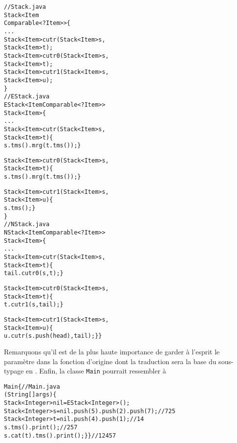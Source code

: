 \begin{alltt}
// Stack.java
\public \abstractX \class Stack<Item
\hfill\extends Comparable<? \super Item>> \{
  ...
  \public    \abstractX Stack<Item> cutr(\final Stack<Item> s,
                                      \final Stack<Item> t);
  \protectedX \abstractX Stack<Item> cutr0(\final Stack<Item> s,
                                       \final Stack<Item> t);
  \protectedX \abstractX Stack<Item> cutr1(\final Stack<Item> s,
                                       \final Stack<Item> u);
\}
// EStack.java
\public \class EStack<Item \extends Comparable<? \super Item>>
       \extends Stack<Item> \{
  ...
  \public Stack<Item> cutr(\final Stack<Item> s,
                          \final Stack<Item> t) \{
    \return s.tms().mrg(t.tms()); \}

  \protectedX Stack<Item> cutr0(\final Stack<Item> s,
                              \final Stack<Item> t) \{
    \return s.tms().mrg(t.tms()); \}

  \protectedX Stack<Item> cutr1(\final Stack<Item> s,
                              \final Stack<Item> u) \{
    \return s.tms(); \}
\}
// NStack.java
\public \class NStack<Item \extends Comparable<? \super Item>>
       \extends Stack<Item> \{
  ...
  \public Stack<Item> cutr(\final Stack<Item> s,
                          \final Stack<Item> t) \{
    \return tail.cutr0(s,t); \}

  \protectedX Stack<Item> cutr0(\final Stack<Item> s,
                              \final Stack<Item> t) \{
    \return t.cutr1(s,tail); \}

  \protectedX Stack<Item> cutr1(\final Stack<Item> s,
                              \final Stack<Item> u) \{
    \return u.cutr(s.push(head),tail); \} \}
\end{alltt}
Remarquons qu'il est de la plus haute importance de garder à l'esprit
le paramètre dans la fonction d'origine dont la traduction sera la
base du sous-typage en \Java. Enfin, la classe \texttt{Main} pourrait
ressembler à
\begin{alltt}
\public \class Main \{\hfill// Main.java
  \public \static \void \main (String[] args) \{
    Stack<Integer> nil = \new EStack<Integer>();
    Stack<Integer> s = nil.push(5).push(2).push(7);\hfill// 7 2 5
    Stack<Integer> t = nil.push(4).push(1);\hfill// 1 4
    s.tms().print();\hfill// 2 5 7
    s.cat(t).tms().print(); \} \}\hfill// 1 2 4 5 7
\end{alltt}
